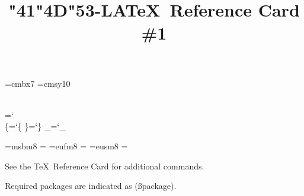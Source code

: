 \font\smalltitle=cmbx7 
\font\titlecal=cmsy10 
\def\LaTeX{L\kern-5.6pt\raise4pt\hbox{\smalltitle A}\kern-1.6pt\TeX}
\def\AMS{{\titlecal\char"41\kern-3.2pt\lower4pt\hbox{\char"4D}\kern-1pt\char"53}}
\def\AMSLaTeX{\AMS\raise1.5pt\hbox{-}\LaTeX}
\def\smallLaTeX{L\kern-3pt\raise2pt\hbox{\smash{\sevenrm A}}\kern-1pt\TeX}

\chardef\\=`\\
\chardef\{=`\{
\chardef\}=`\}
\chardef\_=`\_

\font\eightmsb=msbm8
\newfam\msbfam
\textfont\msbfam=\eightmsb
\def\Bbb#1{{\fam\msbfam\relax#1}}
\def\nmid{{\eightmsb\char"2D}}
\font\eighteufm=eufm8
\newfam\eufmfam
\textfont\eufmfam=\eighteufm
\def\frak#1{{\fam\eufmfam\relax#1}}
\font\eighteusm=eusm8
\newfam\eusmfam
\textfont\eusmfam=\eighteusm
\def\script#1{{\fam\eusmfam\relax#1}}

\def\cs#1{{\tt\\#1}}
\def\css#1#2{{\tt\\#1 \dots\\#2}}
\def\qcs#1{\quad{\tt\\#1}}
\def\qcss#1#2{\quad{\tt\\#1 \dots\\#2}}
\def\qqcs#1{\qquad{\tt\\#1}}
\def\<#1>{$\langle${\rm #1}$\rangle$}
\def\HR{\noalign{\hrule height.4pt depth-.35pt width 1in}}
\def\hcr{\hidewidth\cr}

\title{\AMSLaTeX~Reference Card \#1}
\smallskip
\centerline{See the \TeX\ Reference Card for additional commands.}
\centerline{Required packages are indicated as {(\ss package)}.}

